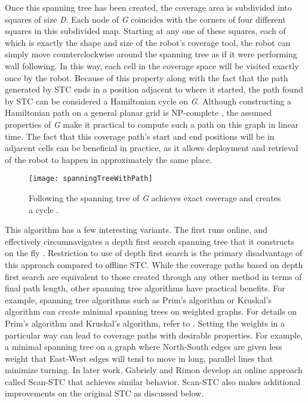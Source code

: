 Once this spanning tree has been created, the coverage area is subdivided into squares of size \textit{D}. Each node of \textit{G} coincides with the corners of four different squares in this subdivided map. Starting at any one of these squares, each of which is exactly the shape and size of the robot's coverage tool, the robot can simply move counterclockwise around the spanning tree as if it were performing wall following. In this way, each cell in the coverage space will be visited exactly once by the robot. Because of this property along with the fact that the path generated by STC ends in a position adjacent to where it started, the path found by STC can be considered a Hamiltonian cycle on \textit{G}. Although constructing a Hamiltonian path on a general planar grid is NP-complete \cite{Itai}, the assumed properties of \textit{G} make it practical to compute such a path on this graph in linear time. The fact that this coverage path's start and end positions will be in adjacent cells can be beneficial in practice, as it allows deployment and retrieval of the robot to happen in approximately the same place.

\begin{figure}[H]
\texttt{[image: spanningTreeWithPath]}
\caption[Spanning Tree Coverage Path]{Following the spanning tree of \textit{G} achieves exact coverage and creates a cycle \cite{STC}.}
\end{figure}

This algorithm has a few interesting variants. The first runs online, and effectively circumnavigates a depth first search spanning tree that it constructs on the fly \cite{STC}. Restriction to use of depth first search is the primary disadvantage of this approach compared to offline STC. While the coverage paths based on depth first search are equivalent to those created through any other method in terms of final path length, other spanning tree algorithms have practical benefits. For example, spanning tree algorithms such as Prim's algorithm or Kruskal's algorithm can create minimal spanning trees on weighted graphs. For details on Prim's algorithm and Kruskal's algorithm, refer to \cite{CormenAlg}. Setting the weights in a particular way can lead to coverage paths with desirable properties. For example, a minimal spanning tree on a graph where North-South edges are given less weight that East-West edges will tend to move in long, parallel lines that minimize turning. In later work, Gabriely and Rimon develop an online approach called Scan-STC that achieves similar behavior. Scan-STC also makes additional improvements on the original STC as discussed below.


